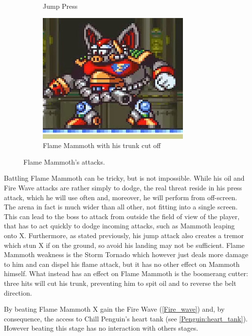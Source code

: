 \begin{figure}[htp]
\begin{subfigure}{\textwidth}
		\caption{Jump Press}
	\end{subfigure}
	\begin{subfigure}{0.3\textwidth}
	\centering
	\includegraphics[width=\linewidth]{figures/X1/Flame_mammoth/Mammoth_cut.jpg}
	\caption{Flame Mammoth with his trunk cut off}
\end{subfigure}
	\caption{Flame Mammoth's attacks.}
\end{figure}

Battling Flame Mammoth can be tricky, but is not impossible. While his oil and Fire Wave attacks are rather simply to dodge, the real threat reside in his press attack, which he will use often and, moreover, he will perform from off-screen. The arena in fact is much wider than all other, not fitting into a single screen. This can lead to the boss to attack from outside the field of view of the player, that has  to act quickly to dodge incoming attacks, such as Mammoth leaping onto X. Furthermore, as stated previously, his jump attack also creates a tremor which stun X if on the ground, so avoid his landing may not be sufficient. Flame Mammoth weakness is the Storm Tornado which however just deals more damage to him and can dispel his flame attack, but it has no other effect on Mammoth himself. What instead has an effect on Flame Mammoth is the boomerang cutter: three hits will cut his trunk, preventing him to spit oil and to reverse the belt direction.

By beating Flame Mammoth X gain the Fire Wave (\ref{Fire_wave}) and, by consequence, the access to Chill Penguin's heart tank (see \ref{Penguin:heart_tank}). However beating this stage has no interaction with others stages.

